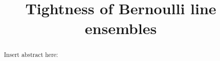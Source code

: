 \documentclass[11pt,letterpaper]{amsart}
\title{Tightness of Bernoulli line ensembles}
\numberwithin{equation}{section}
\begin{document}
\maketitle

\begin{abstract}
Insert abstract here:
\end{abstract}



\tableofcontents












\end{document}
